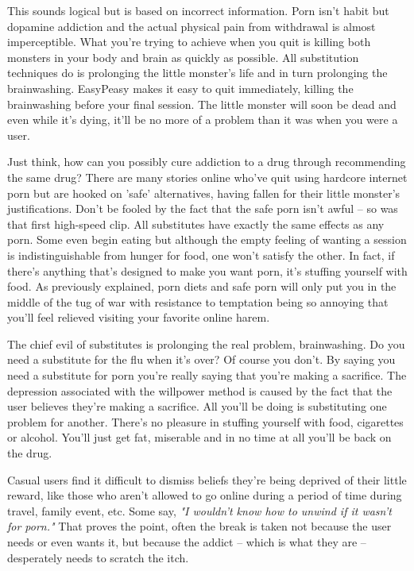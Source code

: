 \documentclass[easypeasy.tex]{subfiles}
\begin{document}
This sounds logical but is based on incorrect information. Porn isn't habit but dopamine addiction and the actual physical pain from withdrawal is almost imperceptible. What you're trying to achieve when you quit is killing both monsters in your body and brain as quickly as possible. All substitution techniques do is prolonging the little monster's life and in turn prolonging the brainwashing. EasyPeasy makes it easy to quit immediately, killing the brainwashing before your final session. The little monster will soon be dead and even while it's dying, it'll be no more of a problem than it was when you were a user.

Just think, how can you possibly cure addiction to a drug through recommending the same drug? There are many stories online who've quit using hardcore internet porn but are hooked on 'safe' alternatives, having fallen for their little monster's justifications. Don't be fooled by the fact that the safe porn isn't awful -- so was that first high-speed clip. All substitutes have exactly the same effects as any porn. Some even begin eating but although the empty feeling of wanting a session is indistinguishable from hunger for food, one won't satisfy the other. In fact, if there's anything that's designed to make you want porn, it's stuffing yourself with food. As previously explained, porn diets and safe porn will only put you in the middle of the tug of war with resistance to temptation being so annoying that you'll feel relieved visiting your favorite online harem.

The chief evil of substitutes is prolonging the real problem, brainwashing. Do you need a substitute for the flu when it's over? Of course you don't. By saying you need a substitute for porn you're really saying that you're making a sacrifice. The depression associated with the willpower method is caused by the fact that the user believes they're making a sacrifice. All you'll be doing is substituting one problem for another. There's no pleasure in stuffing yourself with food, cigarettes or alcohol. You'll just get fat, miserable and in no time at all you'll be back on the drug.

Casual users find it difficult to dismiss beliefs they're being deprived of their little reward, like those who aren't allowed to go online during a period of time during travel, family event, etc. Some say, \textit{"I wouldn't know how to unwind if it wasn't for porn."} That proves the point, often the break is taken not because the user needs or even wants it, but because the addict -- which is what they are -- desperately needs to scratch the itch.
\end{document}
